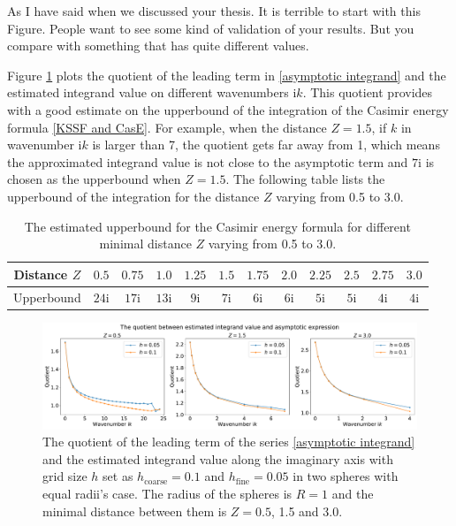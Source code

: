 {\color{red} As I have said when we discussed your thesis. It is terrible to start with this Figure. People want to see some kind of validation of your results.
But you compare with something that has quite different values.}

Figure \ref{Abs equal} plots the quotient of the leading term in \eqref{asymptotic integrand} and the estimated integrand value on different 
wavenumbers $\mathrm{i}k$. This quotient provides with a good estimate on the upperbound of the integration of the Casimir energy formula \eqref{KSSF and CasE}. 
For example, when the distance $Z = 1.5$, if $k$ in wavenumber $\mathrm{i}k$ is larger than 7, the quotient gets far away from 1, which means the approximated 
integrand value is not close to the asymptotic term and $7\mathrm{i}$ is chosen as the upperbound when $Z = 1.5$. The following table lists the upperbound 
of the integration for the distance $Z$ varying from 0.5 to 3.0.

\begin{table}[H]
    \centering
    \begin{tabular}{ |c|c|c|c|c|c|c|c|c|c|c|c| }
        \hline
        Distance $Z$ & $ 0.5$ & $ 0.75$  & $ 1.0$ & $1.25$ & $ 1.5$ & $1.75$  & $2.0$ & $2.25$ & $ 2.5$ & $ 2.75$  & $3.0$ \\\hline
        Upperbound & $24\mathrm{i}$ & $17\mathrm{i}$ & $13\mathrm{i}$ & $9\mathrm{i}$ & $7\mathrm{i}$ & $6\mathrm{i}$ & $6\mathrm{i}$ & $5\mathrm{i}$ & $5\mathrm{i}$ & $4\mathrm{i}$ & $4\mathrm{i}$ \\\hline
       \end{tabular}
       \caption{\label{Equal: distance and upperbound} The estimated upperbound for the Casimir energy formula for different minimal distance $Z$ varying from 
       0.5 to 3.0.}
\end{table}
 
\begin{figure}[H]
    \centering
    \hspace*{-1.4cm}\includegraphics[scale = 0.37]{figures/rel_err_equal.pdf}
    \caption{The quotient of the leading term of the series \eqref{asymptotic integrand} and the estimated integrand value along the imaginary axis
    with grid size $h$ set as $h_{\text{coarse}} = 0.1$ and $ h_{\text{fine}} = 0.05$ in two spheres with equal radii's case. The radius of the spheres is $R = 1$ and the minimal distance between them is $Z = 0.5$, 1.5 and 3.0. }
    \label{Abs equal}
\end{figure}

